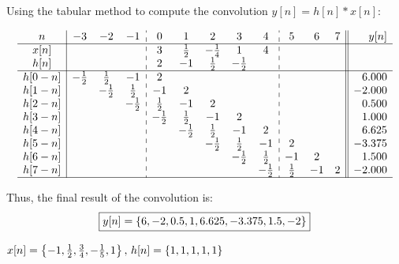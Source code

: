 \documentclass[a4paper, 10pt]{article}
\begin{document}
\begin{solution}
Using the tabular method to compute the convolution \( y[n] = h[n] * x[n] \):

\renewcommand{\arraystretch}{1.3}
\[
\begin{array}{c|ccc:ccccc:ccc||r}
n  & -3 & -2 & -1 & 0 & 1 & 2 & 3 & 4 & 5 & 6 & 7 & y[n] \\
\hline
x[n] &  &  &  & 3 & \frac{1}{2} & -\frac{1}{4} & 1 & 4 &  &  &  &  \\
h[n] &  &  &  & 2 & -1 & \frac{1}{2} & -\frac{1}{2} &  &  &  &  &  \\
\hline
h[0-n] & -\frac{1}{2} & \frac{1}{2} & -1 & 2 &  &  &  &  &  &  &  & 6.000 \\
h[1-n] &  & -\frac{1}{2} & \frac{1}{2} & -1 & 2 &  &  &  &  &  &  & -2.000 \\
h[2-n] &  &  & -\frac{1}{2} & \frac{1}{2} & -1 & 2 &  &  &  &  &  & 0.500 \\
h[3-n] &  &  &  & -\frac{1}{2} & \frac{1}{2} & -1 & 2 &  &  &  &  & 1.000 \\
h[4-n] &  &  &  &  & -\frac{1}{2} & \frac{1}{2} & -1 & 2 &  &  &  & 6.625 \\
h[5-n] &  &  &  &  &  & -\frac{1}{2} & \frac{1}{2} & -1 & 2 &  &  & -3.375 \\
h[6-n] &  &  &  &  &  &  & -\frac{1}{2} & \frac{1}{2} & -1 & 2 &  & 1.500 \\
h[7-n] &  &  &  &  &  &  &  & -\frac{1}{2} & \frac{1}{2} & -1 & 2 & -2.000 \\
\hline
\end{array}
\]

Thus, the final result of the convolution is:
\[ \boxed{ y[n] = \left\{ 6, -2, 0.5, 1, 6.625, -3.375, 1.5, -2 \right\} } \]
\end{solution}


\begin{subproblems}[start=4]
    \item \( x[n] = \left\{ -1, \frac{1}{2}, \frac{3}{4}, -\frac{1}{5}, 1 \right\},\, h[n] = \left\{ 1, 1, 1, 1, 1 \right\} \)
\end{subproblems}
\end{document}
